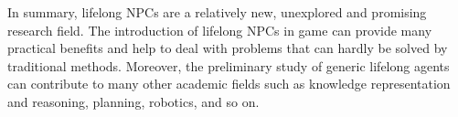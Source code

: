 In summary, lifelong NPCs are a relatively new, unexplored and promising research field. The introduction of lifelong NPCs in game can provide many practical benefits and help to deal with problems that can hardly be solved by traditional methods. Moreover, the preliminary study of generic lifelong agents can contribute to many other academic fields such as knowledge representation and reasoning, planning, robotics, and so on.

